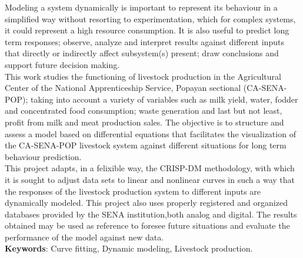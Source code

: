 
Modeling a system dynamically is important to represent its behaviour in a simplified way without resorting to experimentation, which for complex systems, it could represent a high resource consumption. It is also useful to predict long term responses; observe, analyze and interpret results against different inputs that directly or indirectly affect subsystem(s) present; draw conclusions and support future decision making.\\

This work studies the functioning of livestock production in the Agricultural Center of the National Apprenticeship Service, Popayan sectional (CA-SENA-POP); taking into account a variety of variables such as milk yield, water, fodder and concentrated food consumption; waste generation and last but not least, profit from milk and meat production sales. The objective is to structure and assess a model based on differential equations that facilitates the visualization of the CA-SENA-POP livestock system against different situations for long term behaviour prediction.\\

This project adapts, in a felixible way, the CRISP-DM methodology, with which it is sought to adjust
data sets to linear and nonlinear curves in such a way that the responses of the livestock production system to different inputs are dynamically modeled. This project also uses properly registered and organized databases provided by the SENA institution,both analog and digital.
The results obtained may be used as reference to foresee future situations and evaluate the performance of the model against new data.\\


{\bf Keywords}: Curve fitting, Dynamic modeling, Livestock production.
